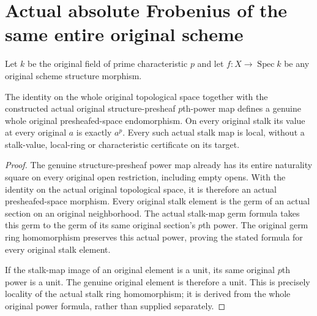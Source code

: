 \section{Actual absolute Frobenius of the same entire original scheme}
\label{sec:scheme-frobenius}

Let $k$ be the original field of prime characteristic $p$ and let
$f:X\to\operatorname{Spec}k$ be any original scheme structure morphism.

\begin{theorem}
\label{lem:cartier-original-frobenius-stalks}
\leanok
The identity on the whole original topological space together with
the constructed actual original structure-presheaf
$p$th-power map defines a genuine whole original presheafed-space
endomorphism. On every original stalk its value at every original
$a$ is exactly $a^p$. Every such actual stalk map is local, without
a stalk-value, local-ring or characteristic certificate on its target.
\end{theorem}
\begin{proof}
The genuine structure-presheaf power map already has its entire
naturality square on every original open restriction, including
empty opens. With the identity on the actual original topological
space, it is therefore an actual presheafed-space morphism.
Every original stalk element is the germ of an actual section on
an original neighborhood. The actual stalk-map germ formula takes
this germ to the germ of its same original section's $p$th power.
The original germ ring homomorphism preserves this actual power,
proving the stated formula for every original stalk element.

If the stalk-map image of an original element is a unit, its same
original $p$th power is a unit. The genuine original element is
therefore a unit. This is precisely locality of the actual stalk
ring homomorphism; it is derived from the whole original power
formula, rather than supplied separately.
\end{proof}

